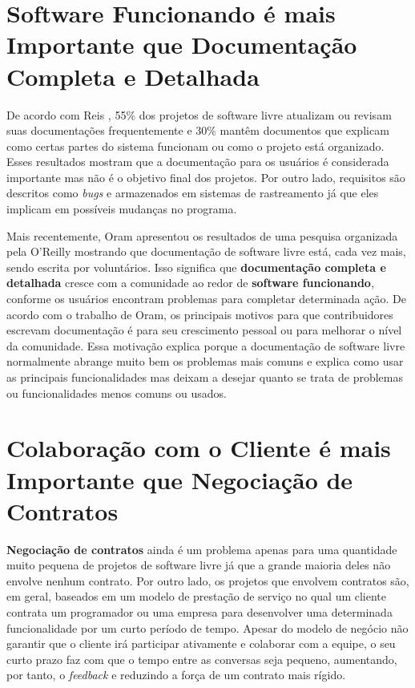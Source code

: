 \section{Software Funcionando é mais Importante que Documentação
  Completa e Detalhada}
\label{sec:second-princ}

De acordo com Reis \cite{Reis2003}, 55\% dos projetos de software
livre atualizam ou revisam suas documentações frequentemente e 30\%
mantêm documentos que explicam como certas partes do sistema funcionam
ou como o projeto está organizado. Esses resultados mostram que a
documentação para os usuários é considerada importante mas não é o
objetivo final dos projetos. Por outro lado, requisitos são descritos
como \emph{bugs} e armazenados em sistemas de rastreamento já que eles
implicam em possíveis mudanças no programa.

Mais recentemente, Oram \cite{Oram2007} apresentou os resultados de
uma pesquisa organizada pela O'Reilly mostrando que documentação de
software livre está, cada vez mais, sendo escrita por
voluntários. Isso significa que \textbf{documentação completa e
  detalhada} cresce com a comunidade ao redor de \textbf{software
  funcionando}, conforme os usuários encontram problemas para
completar determinada ação. De acordo com o trabalho de Oram, os
principais motivos para que contribuidores escrevam documentação é
para seu crescimento pessoal ou para melhorar o nível da
comunidade. Essa motivação explica porque a documentação de software
livre normalmente abrange muito bem os problemas mais comuns e explica
como usar as principais funcionalidades mas deixam a desejar quanto se
trata de problemas ou funcionalidades menos comuns ou usados.

\section{Colaboração com o Cliente é mais Importante que Negociação de
  Contratos}
\label{sec:third-princ}

\textbf{Negociação de contratos} ainda é um problema apenas para uma
quantidade muito pequena de projetos de software livre já que a grande
maioria deles não envolve nenhum contrato. Por outro lado, os projetos
que envolvem contratos são, em geral, baseados em um modelo de
prestação de serviço no qual um cliente contrata um programador ou uma
empresa para desenvolver uma determinada funcionalidade por um curto
período de tempo. Apesar do modelo de negócio não garantir que o
cliente irá participar ativamente e colaborar com a equipe, o seu
curto prazo faz com que o tempo entre as conversas seja pequeno,
aumentando, por tanto, o \emph{feedback} e reduzindo a força de um
contrato mais rígido.

